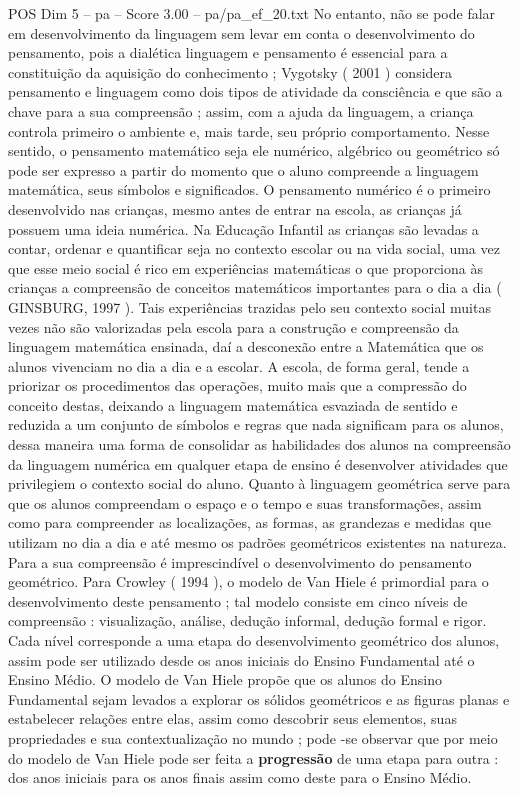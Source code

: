\begin{textsample}{POS Dim 5 – pa – Score 3.00 – pa/pa\_ef\_20.txt}
No entanto, não se pode falar em desenvolvimento da linguagem sem levar em conta o desenvolvimento do pensamento, pois a dialética linguagem e pensamento é essencial para a constituição da aquisição do conhecimento ; Vygotsky ( 2001 ) considera pensamento e linguagem como dois tipos de atividade da consciência e que são a chave para a sua compreensão ; assim, com a ajuda da linguagem, a criança controla primeiro o ambiente e, mais tarde, seu próprio comportamento.
Nesse sentido, o pensamento matemático seja ele numérico, algébrico ou geométrico só pode ser expresso a partir do momento que o aluno compreende a linguagem matemática, seus símbolos e significados.
O pensamento numérico é o primeiro desenvolvido nas crianças, mesmo antes de entrar na escola, as crianças já possuem uma ideia numérica.
Na Educação Infantil as crianças são levadas a contar, ordenar e quantificar seja no contexto escolar ou na vida social, uma vez que esse meio social é rico em experiências matemáticas o que proporciona às crianças a compreensão de conceitos matemáticos importantes para o dia a dia ( GINSBURG, 1997 ).
Tais experiências trazidas pelo seu contexto social muitas vezes não são valorizadas pela escola para a construção e compreensão da linguagem matemática ensinada, daí a desconexão entre a Matemática que os alunos vivenciam no dia a dia e a escolar.
A escola, de forma geral, tende a priorizar os procedimentos das operações, muito mais que a compressão do conceito destas, deixando a linguagem matemática esvaziada de sentido e reduzida a um conjunto de símbolos e regras que nada significam para os alunos, dessa maneira uma forma de consolidar as habilidades dos alunos na compreensão da linguagem numérica em qualquer etapa de ensino é desenvolver atividades que privilegiem o contexto social do aluno.
Quanto à linguagem geométrica serve para que os alunos compreendam o espaço e o tempo e suas transformações, assim como para compreender as localizações, as formas, as grandezas e medidas que utilizam no dia a dia e até mesmo os padrões geométricos existentes na natureza.
Para a sua compreensão é imprescindível o desenvolvimento do pensamento geométrico.
Para Crowley ( 1994 ), o modelo de Van Hiele é primordial para o desenvolvimento deste pensamento ; tal modelo consiste em cinco níveis de compreensão : visualização, análise, dedução informal, dedução formal e rigor.
Cada nível corresponde a uma etapa do desenvolvimento geométrico dos alunos, assim pode ser utilizado desde os anos iniciais do Ensino Fundamental até o Ensino Médio.
O modelo de Van Hiele propõe que os alunos do Ensino Fundamental sejam levados a explorar os sólidos geométricos e as figuras planas e estabelecer relações entre elas, assim como descobrir seus elementos, suas propriedades e sua contextualização no mundo ; pode -se observar que por meio do modelo de Van Hiele pode ser feita a \textbf{progressão} de uma etapa para outra : dos anos iniciais para os anos finais assim como deste para o Ensino Médio.

\end{textsample}
